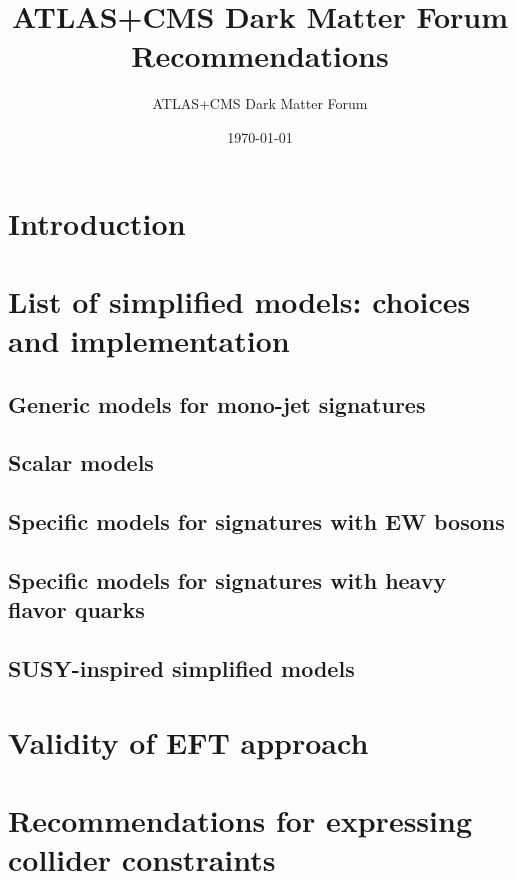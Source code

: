\documentclass[a4,debug,notitlepage,nobib]{tufte-book}
\title{ATLAS+CMS Dark Matter Forum Recommendations}
\author{ATLAS+CMS Dark Matter Forum}
\date{\today}
\newcommand{\blankpage}{\newpage\hbox{}\thispagestyle{empty}\newpage}
\begin{document}
\morefloats
\setcounter{secnumdepth}{2} %



\blankpage

\chapter{Introduction}
\label{sec:Introduction}


\chapter{List of simplified models: choices and implementation}
\label{sec:SimplifiedModelsIntro} 


\section{Generic models for mono-jet signatures}
\label{subsec:MonojetLikeModels}


\section{Scalar models}
\label{subsec:ScalarModels}


\section{Specific models for signatures with EW bosons}
\label{subsec:EWSpecificModels}


\section{Specific models for signatures with heavy flavor quarks}
\label{subsec:DMHFModels}


\section{SUSY-inspired simplified models}
\label{subsec:SUSYModels}


\chapter{Validity of EFT approach}
\label{sec:EFTValidity} 


\chapter{Recommendations for expressing collider constraints}
\label{sec:ColliderConstraints} 




\end{document}
